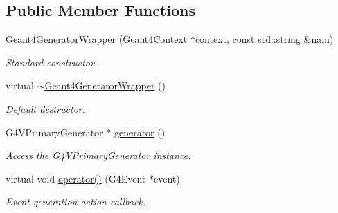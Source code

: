 \subsection*{Public Member Functions}
\begin{DoxyCompactItemize}
\item 
\hyperlink{class_d_d4hep_1_1_simulation_1_1_geant4_generator_wrapper_ac42334940d51e2bd7830429c64b77ced}{Geant4GeneratorWrapper} (\hyperlink{class_d_d4hep_1_1_simulation_1_1_geant4_context}{Geant4Context} $\ast$context, const std::string \&nam)
\begin{DoxyCompactList}\small\item\em Standard constructor. \item\end{DoxyCompactList}\item 
virtual \hyperlink{class_d_d4hep_1_1_simulation_1_1_geant4_generator_wrapper_a6b3f7695a18e97d4aed0f414368ff84a}{$\sim$Geant4GeneratorWrapper} ()
\begin{DoxyCompactList}\small\item\em Default destructor. \item\end{DoxyCompactList}\item 
G4VPrimaryGenerator $\ast$ \hyperlink{class_d_d4hep_1_1_simulation_1_1_geant4_generator_wrapper_a9185103e129d36edd74946ec77ef0b6b}{generator} ()
\begin{DoxyCompactList}\small\item\em Access the G4VPrimaryGenerator instance. \item\end{DoxyCompactList}\item 
virtual void \hyperlink{class_d_d4hep_1_1_simulation_1_1_geant4_generator_wrapper_a073ee3177fe624c0caf2bb5068d9d865}{operator()} (G4Event $\ast$event)
\begin{DoxyCompactList}\small\item\em Event generation action callback. \item\end{DoxyCompactList}\end{DoxyCompactItemize}
